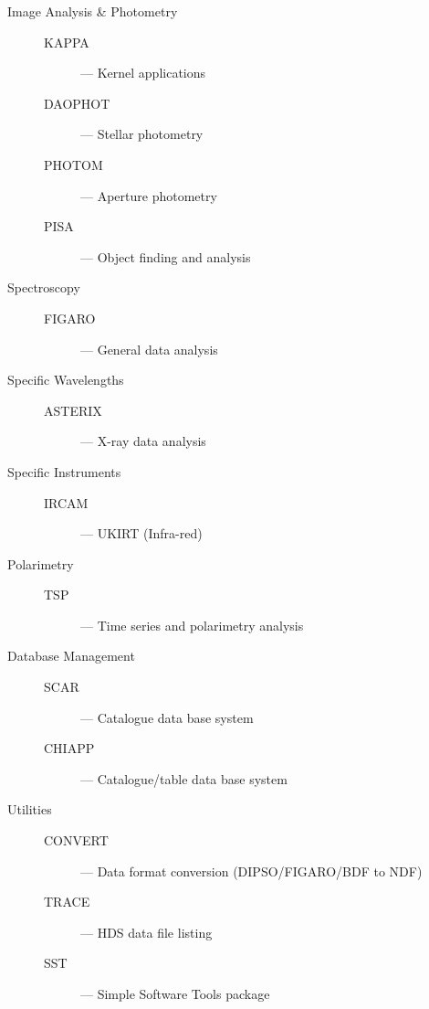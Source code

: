 \begin{description}

\item [Image Analysis \& Photometry] \mbox{}
\begin{description}
\item [KAPPA] --- Kernel applications
\item [DAOPHOT] --- Stellar photometry
\item [PHOTOM] --- Aperture photometry
\item [PISA] --- Object finding and analysis
\end{description}

\item [Spectroscopy] \mbox{}
\begin{description}
\item [FIGARO] --- General data analysis
\end{description}

\item [Specific Wavelengths] \mbox{}
\begin{description}
\item [ASTERIX] --- X-ray data analysis
\end{description}

\item [Specific Instruments] \mbox{}
\begin{description}
\item [IRCAM] --- UKIRT (Infra-red)
\end{description}

\item [Polarimetry] \mbox{}
\begin{description}
\item [TSP] --- Time series and polarimetry analysis
\end{description}

\item [Database Management] \mbox{}
\begin{description}
\item [SCAR] --- Catalogue data base system
\item [CHIAPP] --- Catalogue/table data base system
\end{description}

\item [Utilities] \mbox{}
\begin{description}
\item [CONVERT] --- Data format conversion (DIPSO/FIGARO/BDF to NDF)
\item [TRACE] --- HDS data file listing
\item [SST] --- Simple Software Tools package
\end{description}

\end{description}

